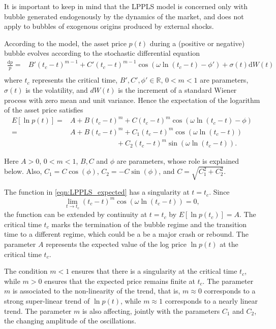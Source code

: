 \documentclass[11pt]{amsart}
\theoremstyle{definition}
\theoremstyle{remark}
\numberwithin{equation}{section}
\def\R{\mathbb{R}}
\begin{document}
It is important to keep in mind that the LPPLS model is concerned only with bubble generated endogenously by the dynamics of the market,
and does not apply to bubbles of exogenous origins produced by external shocks.

According to the model, the asset price $p(t)$ during a  (positive or negative) bubble evolves according to the  stochastic differential equation
\begin{equation}
\begin{split}
 \frac{\textrm{d}p}{p}=&B'(t_c-t)^{m-1}+C'(t_c-t)^{m-1}\cos(\omega\ln (t_c-t)-\phi')+\sigma(t) \textrm{d}W(t)\\
\end{split}\label{eqn:LPPLS_SDE}
\end{equation}
where $t_c$ represents the critical time, $B',C',\phi'\in\R$, $0<m<1$ are parameters, $\sigma(t)$ is the volatility, and $dW(t)$	is the increment of a standard
Wiener process with zero mean and unit variance.
Hence the expectation of the logarithm of the asset price satisfies
\begin{equation}
\begin{split}
E[\ln p(t)]=&A+B(t_c-t)^m+C(t_c-t)^m\cos(\omega\ln (t_c-t)-\phi)\\
=&A+B(t_c-t)^m+C_1(t_c-t)^m\cos(\omega\ln (t_c-t))\\&\qquad \qquad\qquad\,\,\,+C_2(t_c-t)^m\sin(\omega\ln (t_c-t)).
\end{split}
\label{eqn:LPPLS_expected}
\end{equation}

Here $A>0$, $0<m<1$, $B,C$ and $\phi$ are parameters, whose role is explained below.
Also, $C_1=C\cos(\phi)$, $C_2=-C\sin(\phi)$, and $C=\sqrt{C_1^2+C_2^2}$.

The function in \eqref{eqn:LPPLS_expected} has a singularity at  $t=t_c$. Since
\[\lim_{t\to t_c} (t_c-t)^m \cos(\omega\ln(t_c-t))=0,\] the function can be extended by continuity at $t=t_c$ by $E[\ln p(t_c)]=A$.
The critical time $t_c$ marks the termination of the
bubble  regime and the transition time to a different regime, which could be a
be a major crash or rebound.
The parameter $A$ represents the expected value of the log price $\ln p(t)$ at the critical time $t_c$.

The condition $m < 1$ ensures that there is a singularity at the critical time $t_c$, while $m > 0$
ensures that the expected price remains finite  at $t_c$.  The parameter $m$ is associated to the non-linearity of the trend,
that is,  $m\approx 0$ corresponds to a  strong  super-linear trend of $\ln p(t)$, while $m\approx 1$ corresponds to a  nearly linear trend.
The parameter $m$ is also affecting, jointly with the parameters $C_1$ and $C_2$, the changing amplitude of the oscillations.
\end{document}
